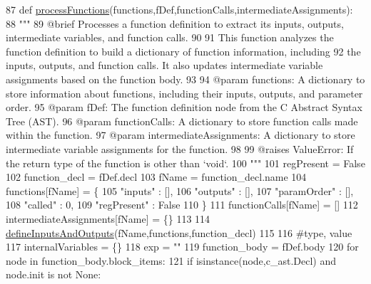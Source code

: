 \begin{DoxyCode}
87 \textcolor{keyword}{def }\hyperlink{namespaceutils_a4934e690de4b9b81cb16a1df0dbd73b9}{processFunctions}(functions,fDef,functionCalls,intermediateAssignments):
88     \textcolor{stringliteral}{"""
}
89 \textcolor{stringliteral}{    @brief Processes a function definition to extract its inputs, outputs, intermediate variables, and
       function calls.
}
90 \textcolor{stringliteral}{
}
91 \textcolor{stringliteral}{    This function analyzes the function definition to build a dictionary of function information,
       including
}
92 \textcolor{stringliteral}{    the inputs, outputs, and function calls. It also updates intermediate variable assignments based on the
       function body.
}
93 \textcolor{stringliteral}{
}
94 \textcolor{stringliteral}{    @param functions: A dictionary to store information about functions, including their inputs, outputs,
       and parameter order.
}
95 \textcolor{stringliteral}{    @param fDef: The function definition node from the C Abstract Syntax Tree (AST).
}
96 \textcolor{stringliteral}{    @param functionCalls: A dictionary to store function calls made within the function.
}
97 \textcolor{stringliteral}{    @param intermediateAssignments: A dictionary to store intermediate variable assignments for the
       function.
}
98 \textcolor{stringliteral}{
}
99 \textcolor{stringliteral}{    @raises ValueError: If the return type of the function is other than `void`.
}
100 \textcolor{stringliteral}{    """}
101     regPresent = \textcolor{keyword}{False}
102     function\_decl = fDef.decl
103     fName = function\_decl.name
104     functions[fName] = \{
105         \textcolor{stringliteral}{"inputs"} : [],
106         \textcolor{stringliteral}{"outputs"} : [],
107         \textcolor{stringliteral}{"paramOrder"} : [],
108         \textcolor{stringliteral}{"called"} : 0,
109         \textcolor{stringliteral}{"regPresent"} : \textcolor{keyword}{False}
110     \}
111     functionCalls[fName] = []
112     intermediateAssignments[fName] = \{\}
113 
114     \hyperlink{namespaceutils_ad890ef664f4412df3dbe4f96f71261bd}{defineInputsAndOutputs}(fName,functions,function\_decl)
115 
116     \textcolor{comment}{#type, value
}
117     internalVariables = \{\}
118     exp = \textcolor{stringliteral}{""}
119     function\_body = fDef.body
120     \textcolor{keywordflow}{for} node \textcolor{keywordflow}{in} function\_body.block\_items:
121         \textcolor{keywordflow}{if} isinstance(node,c\_ast.Decl) \textcolor{keywordflow}{and} node.init \textcolor{keywordflow}{is} \textcolor{keywordflow}{not} \textcolor{keywordtype}{None}:

\end{DoxyCode}
